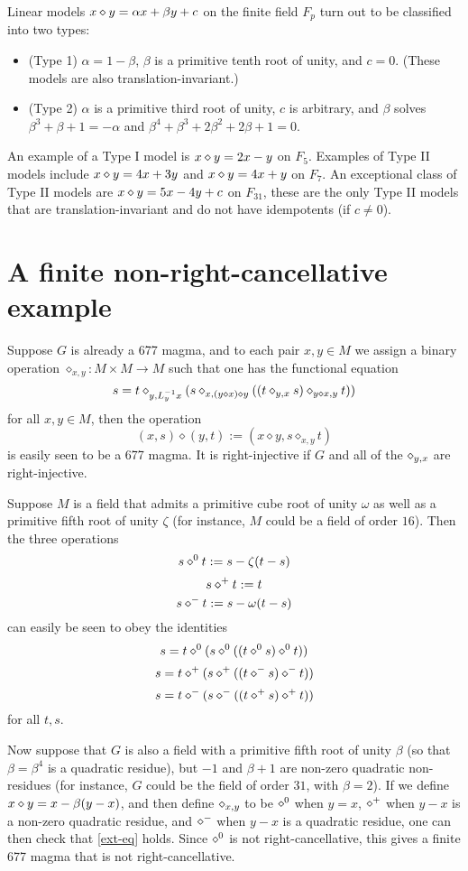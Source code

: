 Linear models $x \diamond y = \alpha x + \beta y + c$ on the finite field $F_p$ turn out to be classified into two types:
\begin{itemize}
\item (Type 1) $\alpha=1-\beta$, $\beta$ is a primitive tenth root of unity, and $c=0$.  (These models are also translation-invariant.)
\item (Type 2) $\alpha$ is a primitive third root of unity, $c$ is arbitrary, and $\beta$ solves $\beta^3+\beta+1=-\alpha$ and $\beta^4+\beta^3+2\beta^2+2\beta+1=0$.
\end{itemize}
An example of a Type I model is $x \diamond y = 2x-y$ on $F_5$.  Examples of Type II models include $x \diamond y = 4x+3y$ and $x \diamond y = 4x+y$ on $F_7$.  An exceptional class of Type II models are $x \diamond y = 5x-4y+c$ on $F_{31}$, these are the only Type II models that are translation-invariant and do not have idempotents (if $c \neq 0$).

\section{A finite non-right-cancellative example}

Suppose $G$ is already a 677 magma, and to each pair $x,y \in M$ we assign a binary operation $\diamond_{x,y}: M \times M \to M$ such that one has the functional equation
\begin{equation}\label{ext-eq}
  s = t \diamond_{y,L_y^{-1} x} (s \diamond_{x, (y \diamond x) \diamond y} ((t \diamond_{y,x} s) \diamond_{y \diamond x, y} t))
\end{equation}
for all $x,y \in M$, then the operation
$$ (x,s) \diamond (y,t) := (x \diamond y, s \diamond_{x,y} t)$$
is easily seen to be a 677 magma.  It is right-injective if $G$ and all of the $\diamond_{y,x}$ are right-injective.

Suppose $M$ is a field that admits a primitive cube root of unity $\omega$ as well as a primitive fifth root of unity $\zeta$ (for instance, $M$ could be a field of order $16$).  Then the three operations
$$ s \diamond^0 t := s - \zeta(t-s)$$
$$ s \diamond^+ t := t$$
$$ s \diamond^- t := s - \omega(t-s)$$
can easily be seen to obey the identities
$$s = t \diamond^0 (s \diamond^0 ((t \diamond^0 s) \diamond^0 t))$$
$$s = t \diamond^+ (s \diamond^+ ((t \diamond^- s) \diamond^- t))$$
$$s = t \diamond^- (s \diamond^- ((t \diamond^+ s) \diamond^+ t))$$
for all $t,s$.

Now suppose that $G$ is also a field with a primitive fifth root of unity $\beta$ (so that $\beta = \beta^4$ is a quadratic residue), but $-1$ and $\beta+1$ are non-zero quadratic non-residues (for instance, $G$ could be the field of order $31$, with $\beta=2$).  If we define $x \diamond y = x - \beta(y-x)$, and then define $\diamond_{x,y}$ to be $\diamond^0$ when $y=x$, $\diamond^+$ when $y-x$ is a non-zero quadratic residue, and $\diamond^-$ when $y-x$ is a quadratic residue, one can then check that \eqref{ext-eq} holds. Since $\diamond^0$ is not right-cancellative, this gives a finite 677 magma that is not right-cancellative.


